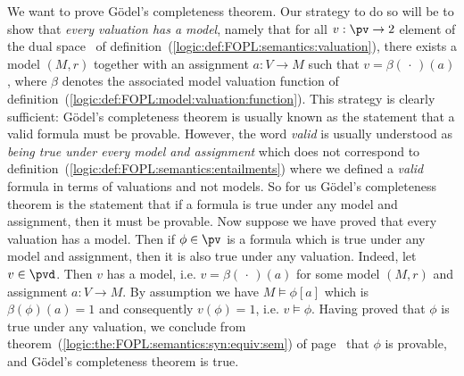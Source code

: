 We want to prove G\"odel's completeness theorem. Our strategy to do
so will be to show that {\em every valuation has a model}, namely
that for all $v:\pv\to 2$ element of the dual space \pvd\ of
definition~(\ref{logic:def:FOPL:semantics:valuation}), there exists
a model $(M,r)$ together with an assignment $a:V\to M$ such that
$v=\beta(\,\cdot\,)(a)$, where $\beta$ denotes the associated model
valuation function of
definition~(\ref{logic:def:FOPL:model:valuation:function}). This
strategy is clearly sufficient: G\"odel's completeness theorem is
usually known as the statement that a valid formula must be
provable. However, the word {\em valid} is usually understood as
{\em being true under every model and assignment} which does not
correspond to
definition~(\ref{logic:def:FOPL:semantics:entailments}) where we
defined a {\em valid} formula in terms of valuations and not models.
So for us G\"odel's completeness theorem is the statement that if a
formula is true under any model and assignment, then it must be
provable. Now suppose we have proved that every valuation has a
model. Then if $\phi\in\pv$ is a formula which is true under any
model and assignment, then it is also true under any valuation.
Indeed, let $v\in\pvd$. Then $v$ has a model, i.e.
$v=\beta(\,\cdot\,)(a)$ for some model $(M,r)$ and assignment
$a:V\to M$. By assumption we have $M\vDash\phi[a]$ which is
$\beta(\phi)(a)=1$ and consequently $v(\phi)=1$, i.e. $v\vDash\phi$.
Having proved that $\phi$ is true under any valuation, we conclude
from theorem~(\ref{logic:the:FOPL:semantics:syn:equiv:sem}) of
page~\pageref{logic:the:FOPL:semantics:syn:equiv:sem} that $\phi$ is
provable, and G\"odel's completeness theorem is true.

